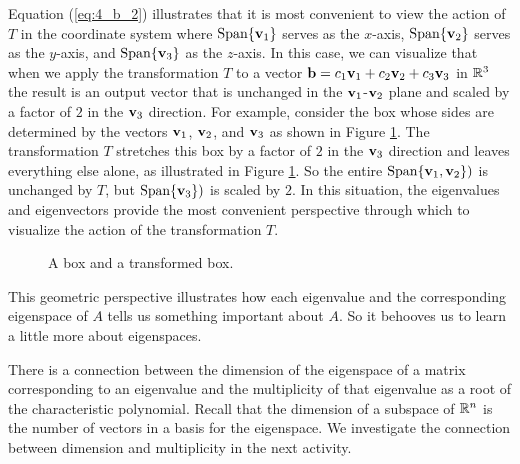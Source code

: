 Equation (\ref{eq:4_b_2}) illustrates that it is most convenient to view the action of $T$ in the coordinate system where $\text{Span} \{\mathbf{v}_1\}$ serves as the $x$-axis, $\text{Span} \{\mathbf{v}_2\}$ serves as the $y$-axis, and $\text{Span} \{\mathbf{v}_3\}$ as the $z$-axis. In this case, we can visualize that when we apply the transformation $T$ to a vector $\mathbf{b} = c_1 \mathbf{v}_1 + c_2 \mathbf{v}_2 + c_3 \mathbf{v}_3$ in $\mathbb{R}^3$ the result is an output vector that is unchanged in the $\mathbf{v}_1$-$\mathbf{v}_2$ plane and scaled by a factor of $2$ in the $\mathbf{v}_3$ direction. For example, consider the box whose sides are determined by the vectors $\mathbf{v}_1$, $\mathbf{v}_2$, and $\mathbf{v}_3$ as shown in Figure \ref{F:4_b_1}. The transformation $T$ stretches this box by a factor of $2$ in the $\mathbf{v}_3$ direction and leaves everything else alone, as illustrated in Figure \ref{F:4_b_1}. So the entire $\text{Span} \{\mathbf{v}_1, \mathbf{v}_2\})$ is unchanged by $T$, but $\text{Span} \{\mathbf{v}_3\})$ is scaled by $2$. In this situation, the eigenvalues and eigenvectors provide the most convenient perspective through which to visualize the action of the transformation $T$. 
\begin{figure}[ht]
\begin{center}
\end{center}
\caption{A box and a transformed box.}
\label{F:4_b_1}
\end{figure}

This geometric perspective illustrates how each eigenvalue and the corresponding eigenspace of $A$ tells us something important about $A$. So it behooves us to learn a little more about eigenspaces. 


\label{sec:egspace_dims}

There is a connection between the dimension of the eigenspace of a matrix corresponding to an eigenvalue and the multiplicity of that eigenvalue as a root of the characteristic polynomial. Recall that the dimension of a subspace of $\mathbb{R}^n$ is the number of vectors in a basis for the eigenspace. We investigate the connection between dimension and multiplicity in the next activity.



